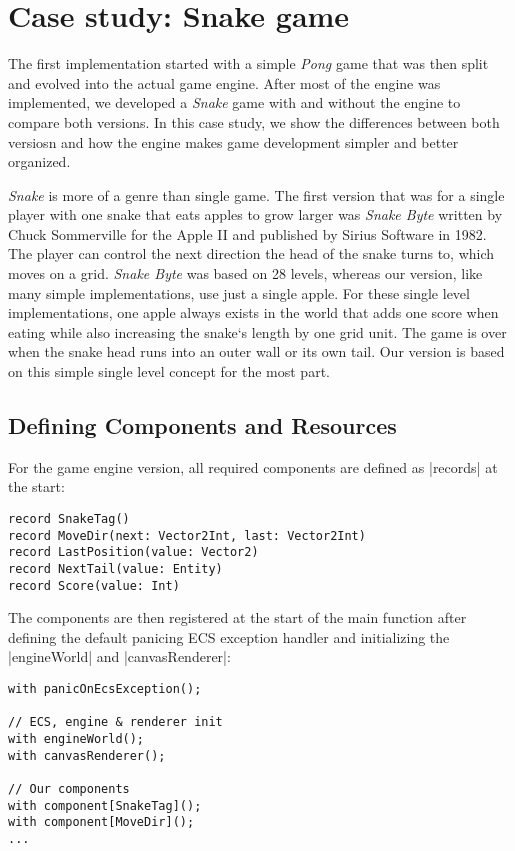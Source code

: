 \chapter{Case study: Snake game}\label{chap:casestudy}

The first implementation started with a simple \textit{Pong} game that was then split and evolved into the actual game engine. After most of the engine was implemented, we developed a \textit{Snake} game with and without the engine to compare both versions. In this case study, we show the differences between both versiosn and how the engine makes game development simpler and better organized.

\textit{Snake} is more of a genre than single game. The first version that was for a single player with one snake that eats apples to grow larger was \textit{Snake Byte} written by Chuck Sommerville for the Apple II and published by Sirius Software in 1982. The player can control the next direction the head of the snake turns to, which moves on a grid. \textit{Snake Byte} was based on 28 levels, whereas our version, like many simple implementations, use just a single apple. For these single level implementations, one apple always exists in the world that adds one score when eating while also increasing the snake`s length by one grid unit. The game is over when the snake head runs into an outer wall or its own tail. Our version is based on this simple single level concept for the most part.

\section{Defining Components and Resources}

For the game engine version, all required components are defined as |records| at the start:

\begin{lstlisting}
record SnakeTag()
record MoveDir(next: Vector2Int, last: Vector2Int)
record LastPosition(value: Vector2)
record NextTail(value: Entity)
record Score(value: Int)
\end{lstlisting}

The components are then registered at the start of the main function after defining the default panicing ECS exception handler and initializing the |engineWorld| and |canvasRenderer|:

\begin{lstlisting}
with panicOnEcsException();

// ECS, engine & renderer init
with engineWorld();
with canvasRenderer();

// Our components
with component[SnakeTag]();
with component[MoveDir]();
...
\end{lstlisting}

